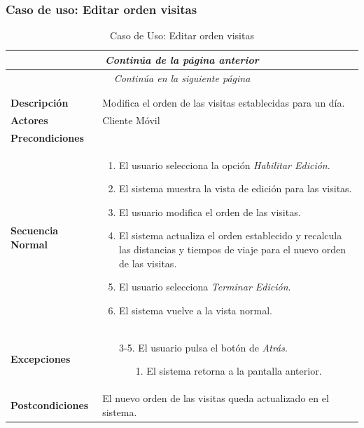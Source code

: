 \subsubsection*{Caso de uso: Editar orden visitas }
\begin{longtable}{| p{4cm} | p{10cm} |}
\endfirsthead
\multicolumn{2}{c}{\textit{Continúa de la página anterior}}\\[12pt]
\hline
\endhead
\hline
\multicolumn{2}{c}{\textit{Continúa en la siguiente página}} \\
\endfoot
\hline
\caption{Caso de Uso: Editar orden visitas}\label{fig:1}\\
\endlastfoot


\hline
\multicolumn{2}{|c|}{\textbf{CU$<$14$>$ - Editar Orden Visitas}} \\

\hline
\textbf{Descripción} &
Modifica el orden de las visitas establecidas para un día.\\

\hline
\textbf{Actores} &
Cliente Móvil\\

\hline
\textbf{Precondiciones} &
\\

\hline
\textbf{Secuencia Normal} &\mbox{}\par\vspace{-\baselineskip}
\begin{enumerate}[leftmargin=0.7cm, topsep=0.1cm]
\item El usuario selecciona la opción \textit{Habilitar Edición}.
\item El sistema muestra la vista de edición para las visitas.
\item El usuario modifica el orden de las visitas.
\item El sistema actualiza el orden establecido y recalcula las distancias y tiempos de viaje para el nuevo orden de las visitas.
\item El usuario selecciona \textit{Terminar Edición}.
\item El sistema vuelve a la vista normal.
\end{enumerate}


\\
\hline
\textbf{Excepciones} &\mbox{}\par\vspace{-\baselineskip}
\begin{enumerate}[leftmargin=0.9cm, topsep=0.1cm]
\item[3-5.] El usuario pulsa el botón de \textit{Atrás}.
	\begin{itemize}
	\item[1.] El sistema retorna a la pantalla anterior.
	\end{itemize}
\end{enumerate}
\\

\hline
\textbf{Postcondiciones} & 
El nuevo orden de las visitas queda actualizado en el sistema.\\
\hline
\end{longtable}



